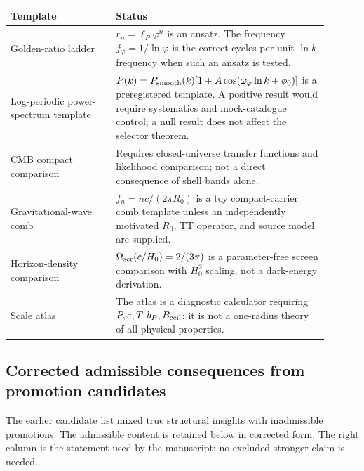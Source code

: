 \documentclass[11pt,a4paper]{article}
\begin{document}
\begin{center}
\small
\begin{tabular}{p{0.30\linewidth}p{0.60\linewidth}}
\toprule
Template & Status\\
\midrule
Golden-ratio ladder & \(r_n=\ell_P\varphi^n\) is an ansatz.  The frequency \(f_\varphi=1/\ln\varphi\) is the correct cycles-per-unit-\(\ln k\) frequency when such an ansatz is tested.\\
Log-periodic power-spectrum template & \(P(k)=P_{\rm smooth}(k)[1+A\cos(\omega_\varphi\ln k+\phi_0)]\) is a preregistered template.  A positive result would require systematics and mock-catalogue control; a null result does not affect the selector theorem.\\
CMB compact comparison & Requires closed-universe transfer functions and likelihood comparison; not a direct consequence of shell bands alone.\\
Gravitational-wave comb & \(f_n=nc/(2\pi R_0)\) is a toy compact-carrier comb template unless an independently motivated \(R_0\), TT operator, and source model are supplied.\\
Horizon-density comparison & \(\Omega_{\rm scr}(c/H_0)=2/(3\pi)\) is a parameter-free screen comparison with \(H_0^2\) scaling, not a dark-energy derivation.\\
Scale atlas & The atlas is a diagnostic calculator requiring \(P,\varepsilon,T,b_P,B_{\rm ceil}\); it is not a one-radius theory of all physical properties.\\
\bottomrule
\end{tabular}
\end{center}

\subsection{Corrected admissible consequences from promotion candidates}

The earlier candidate list mixed true structural insights with inadmissible promotions.
The admissible content is retained below in corrected form.  The right column is the statement used by the manuscript; no excluded stronger claim is needed.
\end{document}
